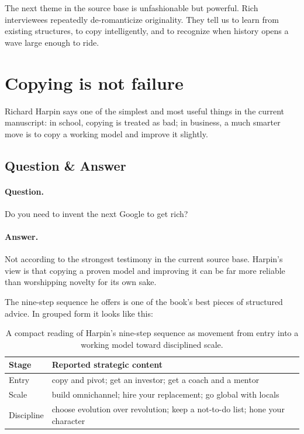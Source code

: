 \documentclass[11pt,oneside]{book}
\begin{document}
The next theme in the source base is unfashionable but powerful. Rich interviewees repeatedly de-romanticize originality. They tell us to learn from existing structures, to copy intelligently, and to recognize when history opens a wave large enough to ride.

\section{Copying is not failure}

Richard Harpin says one of the simplest and most useful things in the current manuscript: in school, copying is treated as bad; in business, a much smarter move is to copy a working model and improve it slightly.

\subsection{Question \& Answer}

\paragraph{Question.} Do you need to invent the next Google to get rich?

\paragraph{Answer.} Not according to the strongest testimony in the current source base. Harpin's view is that copying a proven model and improving it can be far more reliable than worshipping novelty for its own sake.

The nine-step sequence he offers is one of the book's best pieces of structured advice. In grouped form it looks like this:

\begin{table}[h]
\centering
\begin{tabular}{|l|p{}|}
\hline
Stage & Reported strategic content \\
\hline
Entry & copy and pivot; get an investor; get a coach and a mentor \\
\hline
Scale & build omnichannel; hire your replacement; go global with locals \\
\hline
Discipline & choose evolution over revolution; keep a not-to-do list; hone your character \\
\hline
\end{tabular}
\caption{A compact reading of Harpin's nine-step sequence as movement from entry into a working model toward disciplined scale.}
\end{table}
\end{document}
